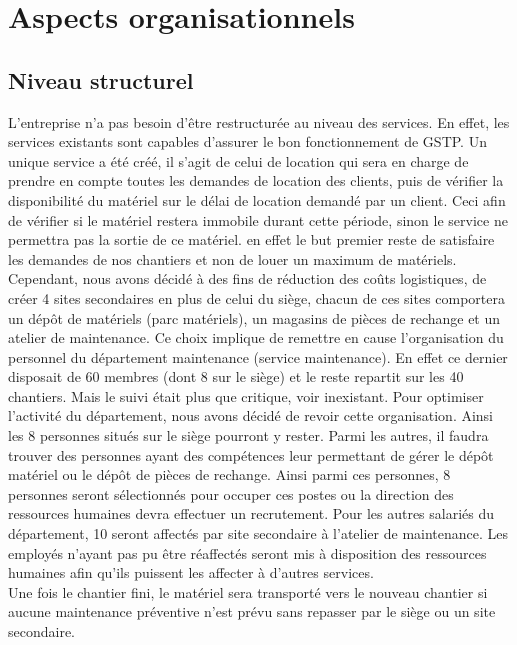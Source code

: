 \section{Aspects organisationnels}
        \subsection{Niveau structurel}
        L'entreprise n'a pas besoin d'être restructurée au niveau des services. En effet, les services existants sont capables d'assurer le bon fonctionnement de GSTP. Un unique service a été créé, il s'agit de celui de location qui sera en charge de prendre en compte toutes les demandes de location des clients, puis de vérifier la disponibilité du matériel sur le délai de location demandé par un client. Ceci afin de vérifier si le matériel restera immobile durant cette période, sinon le service ne permettra pas la sortie de ce matériel. en effet le but premier reste de satisfaire les demandes de nos chantiers et non de louer un maximum de matériels.\\
        
         Cependant, nous avons décidé à des fins de réduction des coûts logistiques, de créer 4 sites secondaires en plus de celui du siège, chacun de ces sites comportera un dépôt de matériels (parc matériels), un magasins de pièces de rechange et un atelier de maintenance. Ce choix implique de remettre en cause l'organisation du personnel du département maintenance (service maintenance). En effet ce dernier disposait de 60 membres (dont 8 sur le siège) et le reste repartit sur les 40 chantiers. Mais le suivi était plus que critique, voir inexistant. Pour optimiser l'activité du département, nous avons décidé de revoir cette organisation. Ainsi les 8 personnes situés sur le siège pourront y rester. Parmi les autres, il faudra trouver des personnes ayant des compétences leur permettant de gérer le dépôt matériel ou le dépôt de pièces de rechange. Ainsi parmi ces personnes, 8 personnes seront sélectionnés pour occuper ces postes ou la direction des ressources humaines devra effectuer un recrutement. Pour les autres salariés du département,
10 seront affectés par site secondaire à l'atelier de maintenance. Les employés n'ayant pas pu être réaffectés seront mis à disposition des ressources humaines afin qu'ils puissent les affecter à d'autres services.\\

Une fois le chantier fini, le matériel sera transporté vers le nouveau chantier si aucune maintenance préventive n'est prévu sans repasser par le siège ou un site secondaire.

